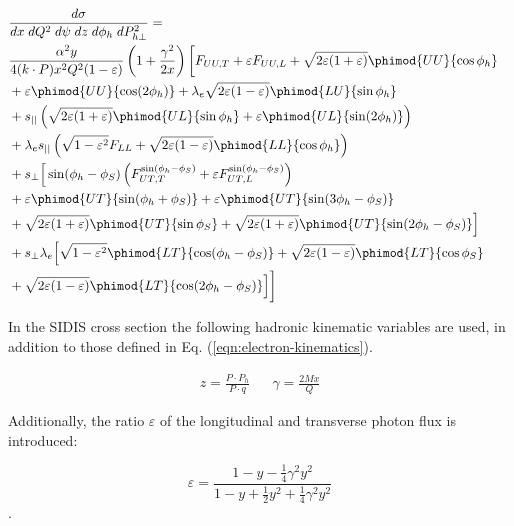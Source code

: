 \begin{eqnarray*} \label{e:crossmaster}
        \lefteqn{\frac{d\sigma}{dx \; dQ^2 \; d\psi \; dz \; d\phi_h \; dP_{h\perp}^2} = } \\
         & \frac{\alpha^2 y}{4 (k \cdot P) x^2 Q^2 (1 - \varepsilon)} \left( 1 +
        \frac{\gamma^2}{2x}\right) \biggl[ F_{UU,T} + \varepsilon F_{UU,L} + \sqrt{2 \varepsilon (1 + \varepsilon)} \phimod{UU}{\cos\phi_h} \notag \\
        & + \varepsilon \phimod{UU}{\cos(2\phi_h)} + \lambda_e \sqrt{2 \varepsilon (1 - \varepsilon)} \phimod{LU}{\sin\phi_h} \notag \\
        & + s_{||} \left( \sqrt{2 \varepsilon (1 + \varepsilon)} \phimod{UL}{\sin\phi_h} + \varepsilon \phimod{UL}{\sin(2\phi_h)} \right) \notag \\
        & + \lambda_e s_{||} \left( \sqrt{1 - \varepsilon^2} F_{LL} +  \sqrt{2 \varepsilon (1 - \varepsilon)} \phimod{LL}{\cos\phi_h} \right) \notag \\
        & + s_\perp \Big[ \sin(\phi_h-\phi_S) \left( F_{UT,T}^{\sin(\phi_h-\phi_S)} + \varepsilon F_{UT,L}^{\sin(\phi_h-\phi_S)} \right) \notag \\
        & + \varepsilon \phimod{UT}{\sin(\phi_h+\phi_S)} + \varepsilon \phimod{UT}{\sin(3\phi_h-\phi_S)} \notag \\
        & + \sqrt{2\varepsilon(1+\varepsilon)} \phimod{UT}{\sin\phi_S} +  \sqrt{2\varepsilon(1+\varepsilon)} \phimod{UT}{\sin(2\phi_h-\phi_S)} \Big] \notag \\
        & + s_\perp \lambda_e \Big[ \sqrt{1-\varepsilon^2} \phimod{LT}{\cos(\phi_h-\phi_S)} + \sqrt{2\varepsilon(1-\varepsilon)} \phimod{LT}{\cos\phi_S} \notag \\
        & + \sqrt{2\varepsilon(1-\varepsilon)} \phimod{LT}{\cos(2\phi_h-\phi_S)} \Big] \biggr]
\end{eqnarray*}

In the SIDIS cross section the following hadronic kinematic variables are used, in addition to those defined in Eq. (\ref{eqn:electron-kinematics}). 

\begin{align}
  z = \frac{P \cdot P_{h}}{P \cdot q} && \gamma = \frac{2Mx}{Q}
\end{align}

Additionally, the ratio $\varepsilon$ of the longitudinal and transverse photon flux is introduced:

\begin{equation}
	\varepsilon = \frac{1 - y - \frac{1}{4}\gamma^2 y^2}{1 - y + \frac{1}{2}y^2 + \frac{1}{4}\gamma^2 y^2}
\end{equation}.

